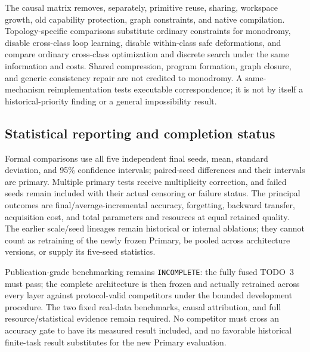 The causal matrix removes, separately, primitive reuse, sharing, workspace
growth, old capability protection, graph constraints, and native compilation.
Topology-specific comparisons substitute ordinary constraints for monodromy,
disable cross-class loop learning, disable within-class safe deformations,
and compare ordinary cross-class optimization and discrete search under the
same information and costs. Shared compression, program formation, graph
closure, and generic consistency repair are not credited to monodromy. A
same-mechanism reimplementation tests executable correspondence; it is not by
itself a historical-priority finding or a general impossibility result.

\subsection{Statistical reporting and completion status}

Formal comparisons use all five independent final seeds, mean, standard
deviation, and 95\% confidence intervals; paired-seed differences and their
intervals are primary. Multiple primary tests receive multiplicity correction,
and failed seeds remain included with their actual censoring or failure status.
The principal outcomes are final/average-incremental accuracy, forgetting,
backward transfer, acquisition cost, and total parameters and resources at
equal retained quality. The earlier scale/seed lineages remain historical or
internal ablations; they cannot count as retraining of the newly frozen Primary,
be pooled across architecture versions, or supply its five-seed statistics.

Publication-grade benchmarking remains \texttt{INCOMPLETE}: the fully fused
TODO~3 must pass; the complete architecture is then frozen
and actually retrained
across every layer against protocol-valid competitors under the bounded
development procedure. The two fixed real-data benchmarks, causal attribution,
and full resource/statistical evidence remain required. No competitor must
cross an accuracy gate to have its measured result included, and no favorable
historical finite-task result substitutes for the new Primary evaluation.

